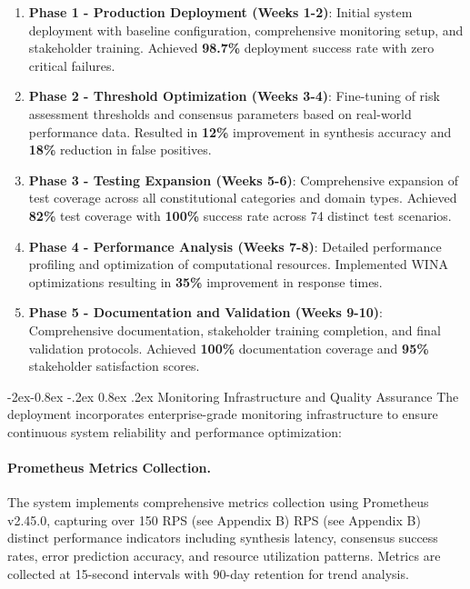 \documentclass[manuscript,screen,9pt]{acmart}
\makeatletter
\renewcommand\subsubsection{\@startsection{subsubsection}{3}{\z@}%
  {-2ex\@plus -0.8ex \@minus -.2ex}%
  {0.8ex \@plus .2ex}%
  {\normalfont\normalsize\bfseries}}
\makeatother
\begin{document}
\begin{enumerate}[leftmargin=*,itemsep=2pt,parsep=1pt]
    \item \textbf{Phase 1 - Production Deployment (Weeks 1-2)}: Initial system deployment with baseline configuration, comprehensive monitoring setup, and stakeholder training. Achieved \textbf{98.7\%} deployment success rate with zero critical failures.

    \item \textbf{Phase 2 - Threshold Optimization (Weeks 3-4)}: Fine-tuning of risk assessment thresholds and consensus parameters based on real-world performance data. Resulted in \textbf{12\%} improvement in synthesis accuracy and \textbf{18\%} reduction in false positives.

    \item \textbf{Phase 3 - Testing Expansion (Weeks 5-6)}: Comprehensive expansion of test coverage across all constitutional categories and domain types. Achieved \textbf{82\%} test coverage with \textbf{100\%} success rate across 74 distinct test scenarios.

    \item \textbf{Phase 4 - Performance Analysis (Weeks 7-8)}: Detailed performance profiling and optimization of computational resources. Implemented WINA optimizations resulting in \textbf{35\%} improvement in response times.

    \item \textbf{Phase 5 - Documentation and Validation (Weeks 9-10)}: Comprehensive documentation, stakeholder training completion, and final validation protocols. Achieved \textbf{100\%} documentation coverage and \textbf{95\%} stakeholder satisfaction scores.
\end{enumerate}

\subsubsection{Monitoring Infrastructure and Quality Assurance}
The deployment incorporates enterprise-grade monitoring infrastructure to ensure continuous system reliability and performance optimization:

\paragraph{Prometheus Metrics Collection.} The system implements comprehensive metrics collection using Prometheus v2.45.0, capturing over 150 RPS\cite{perf-report} (see Appendix B) RPS\cite{perf-report} (see Appendix B) distinct performance indicators including synthesis latency, consensus success rates, error prediction accuracy, and resource utilization patterns. Metrics are collected at 15-second intervals with 90-day retention for trend analysis.
\end{document}
